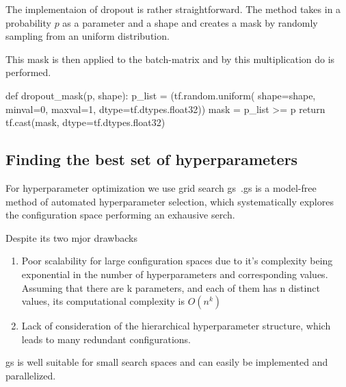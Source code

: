 The implementaion of dropout is rather straightforward. The method takes in a probability $p$ as a parameter and a shape and creates a mask by randomly sampling from an uniform distribution.

This mask is then applied to the batch-matrix and by this multiplication \ac{do} is performed.



def dropout_mask(p, shape):
p_list = (tf.random.uniform(
shape=shape, minval=0, maxval=1, dtype=tf.dtypes.float32))
mask = p_list >= p
return tf.cast(mask, dtype=tf.dtypes.float32)



\subsection{Finding the best set of hyperparameters}
\label{sec:implement:setup: gridsearch}

For hyperparameter optimization we use grid search \ac{gs}~\cite{Lorenzo2017,Yang2020,Zoeller2021}.\Ac{gs} is a model-free method of automated hyperparameter selection, which systematically explores the configuration space performing an exhausive serch.

Despite its two mjor drawbacks

\begin{enumerate}
    \item Poor scalability for large configuration spaces due to it's complexity being exponential in the number of hyperparameters and corresponding values. Assuming that there are k parameters, and each of them has n distinct values, its computational complexity is $O(n^{k})$
    \item Lack of consideration of the hierarchical hyperparameter structure, which leads to many redundant configurations. %
\end{enumerate}

\ac{gs} is well suitable for small search spaces and can easily be implemented and parallelized.



